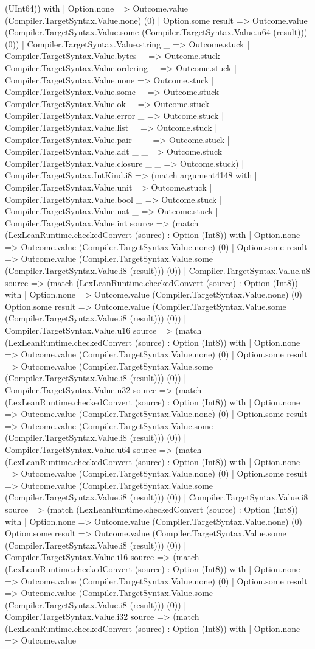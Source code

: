 \documentclass[11pt]{article}
\begin{document}
(UInt64)) with | Option.none => Outcome.value (Compiler.TargetSyntax.Value.none) (0) | Option.some result => Outcome.value (Compiler.TargetSyntax.Value.some (Compiler.TargetSyntax.Value.u64 (result))) (0)) | Compiler.TargetSyntax.Value.string \_ => Outcome.stuck | Compiler.TargetSyntax.Value.bytes \_ => Outcome.stuck | Compiler.TargetSyntax.Value.ordering \_ => Outcome.stuck | Compiler.TargetSyntax.Value.none => Outcome.stuck | Compiler.TargetSyntax.Value.some \_ => Outcome.stuck | Compiler.TargetSyntax.Value.ok \_ => Outcome.stuck | Compiler.TargetSyntax.Value.error \_ => Outcome.stuck | Compiler.TargetSyntax.Value.list \_ => Outcome.stuck | Compiler.TargetSyntax.Value.pair \_ \_ => Outcome.stuck | Compiler.TargetSyntax.Value.adt \_ \_ => Outcome.stuck | Compiler.TargetSyntax.Value.closure \_ \_ => Outcome.stuck) | Compiler.TargetSyntax.IntKind.i8 => (match argument4148 with | Compiler.TargetSyntax.Value.unit => Outcome.stuck | Compiler.TargetSyntax.Value.bool \_ => Outcome.stuck | Compiler.TargetSyntax.Value.nat \_ => Outcome.stuck | Compiler.TargetSyntax.Value.int source => (match (LexLeanRuntime.checkedConvert (source) : Option (Int8)) with | Option.none => Outcome.value (Compiler.TargetSyntax.Value.none) (0) | Option.some result => Outcome.value (Compiler.TargetSyntax.Value.some (Compiler.TargetSyntax.Value.i8 (result))) (0)) | Compiler.TargetSyntax.Value.u8 source => (match (LexLeanRuntime.checkedConvert (source) : Option (Int8)) with | Option.none => Outcome.value (Compiler.TargetSyntax.Value.none) (0) | Option.some result => Outcome.value (Compiler.TargetSyntax.Value.some (Compiler.TargetSyntax.Value.i8 (result))) (0)) | Compiler.TargetSyntax.Value.u16 source => (match (LexLeanRuntime.checkedConvert (source) : Option (Int8)) with | Option.none => Outcome.value (Compiler.TargetSyntax.Value.none) (0) | Option.some result => Outcome.value (Compiler.TargetSyntax.Value.some (Compiler.TargetSyntax.Value.i8 (result))) (0)) | Compiler.TargetSyntax.Value.u32 source => (match (LexLeanRuntime.checkedConvert (source) : Option (Int8)) with | Option.none => Outcome.value (Compiler.TargetSyntax.Value.none) (0) | Option.some result => Outcome.value (Compiler.TargetSyntax.Value.some (Compiler.TargetSyntax.Value.i8 (result))) (0)) | Compiler.TargetSyntax.Value.u64 source => (match (LexLeanRuntime.checkedConvert (source) : Option (Int8)) with | Option.none => Outcome.value (Compiler.TargetSyntax.Value.none) (0) | Option.some result => Outcome.value (Compiler.TargetSyntax.Value.some (Compiler.TargetSyntax.Value.i8 (result))) (0)) | Compiler.TargetSyntax.Value.i8 source => (match (LexLeanRuntime.checkedConvert (source) : Option (Int8)) with | Option.none => Outcome.value (Compiler.TargetSyntax.Value.none) (0) | Option.some result => Outcome.value (Compiler.TargetSyntax.Value.some (Compiler.TargetSyntax.Value.i8 (result))) (0)) | Compiler.TargetSyntax.Value.i16 source => (match (LexLeanRuntime.checkedConvert (source) : Option (Int8)) with | Option.none => Outcome.value (Compiler.TargetSyntax.Value.none) (0) | Option.some result => Outcome.value (Compiler.TargetSyntax.Value.some (Compiler.TargetSyntax.Value.i8 (result))) (0)) | Compiler.TargetSyntax.Value.i32 source => (match (LexLeanRuntime.checkedConvert (source) : Option (Int8)) with | Option.none => Outcome.value 
\end{document}
